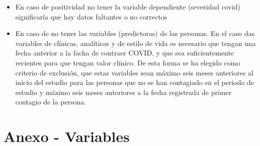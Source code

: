 \documentclass[
]{article}
\begin{document}
\begin{itemize}
\item
  En caso de positividad no tener la variable dependiente (severidad
  covid) significaría que hay datos faltantes o no correctos
\item
  En caso de no tener las variables (predictoras) de las personas. En el
  caso das variables de clínicas, analíticas y de estilo de vida es
  necesario que tengan una fecha anterior a la facha de contraer COVID,
  y que sea suficientemente recientes para que tengan valor clínico. De
  esta forma se ha elegido como criterio de exclusión, que estas
  variables sean máximo seis meses anteriores al inicio del estudio para
  las personas que no se han contagiado en el periodo de estudio y
  máximo seis meses anteriores a la fecha registrada de primer contagio
  de la persona.
\end{itemize}

\pagebreak

\pagebreak

\hypertarget{anexo---variables}{%
\section{Anexo - Variables}\label{anexo---variables}}
\end{document}
